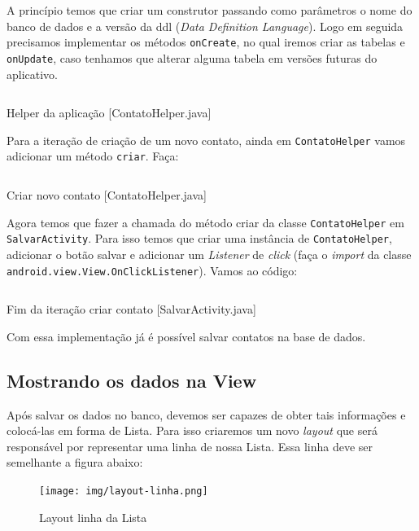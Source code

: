 A princípio temos que criar um construtor passando como parâmetros o
nome do banco de dados e a versão da \gls{ddl} (\emph{Data Definition
Language}). Logo em seguida precisamos implementar os métodos
\texttt{onCreate}, no qual iremos criar as tabelas e \texttt{onUpdate},
caso tenhamos que alterar alguma tabela em versões futuras do
aplicativo.

\begin{listing}[H]
  \inputminted[linenos=true,frame=bottomline,tabsize=3]{ java }{ source/ContatoHelper-1.java }
  \caption{Helper da aplicação [ContatoHelper.java]}
\end{listing}

Para a iteração de criação de um novo contato, ainda em
\texttt{ContatoHelper} vamos adicionar um método \texttt{criar}. Faça:

\begin{listing}[H]
  \inputminted[linenos=true,frame=bottomline,tabsize=3]{ java }{ source/ContatoHelper-2.java }
  \caption{Criar novo contato [ContatoHelper.java]}
\end{listing}

Agora temos que fazer a chamada do método criar da classe
\texttt{ContatoHelper} em \texttt{SalvarActivity}. Para isso temos que
criar uma instância de \texttt{ContatoHelper}, adicionar o botão salvar
e adicionar um \emph{Listener} de \emph{click} (faça o \emph{import} da
classe \newline
\texttt{android.view.View.OnClickListener}). Vamos ao código:

\begin{listing}[H]
  \inputminted[linenos=true,frame=bottomline,tabsize=3]{ java }{ source/SalvarActivity-2.java }
  \caption{Fim da iteração criar contato [SalvarActivity.java]}
\end{listing}

Com essa implementação já é possível salvar contatos na base de dados.

\subsection{Mostrando os dados na View \label{ssec:listview}}

Após salvar os dados no banco, devemos ser capazes de obter tais
informações e colocá-las em forma de Lista. Para isso criaremos um novo
\emph{layout} que será responsável por representar uma linha de nossa
Lista. Essa linha deve ser semelhante a figura abaixo:

\begin{figure}[h]
    \centering
    \texttt{[image: img/layout-linha.png]}
    \caption{Layout linha da Lista}
\end{figure}


